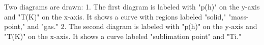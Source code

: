 Two diagrams are drawn:  
1. The first diagram is labeled with "p(h)" on the y-axis and "T(K)" on the x-axis. It shows a curve with regions labeled "solid," "mass-point," and "gas."  
2. The second diagram is labeled with "p(h)" on the y-axis and "T(K)" on the x-axis. It shows a curve labeled "sublimation point" and "Ti."